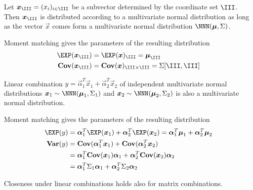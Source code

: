 \documentclass[landscape,footrule]{foils}
\renewcommand{\VAR}{\mathbf{Var}}
\newcommand{\COV}{\mathbf{Cov}}
\begin{document}


Let $\vec{x}_{\III}=(x_i)_{i\in\III}$ be a subvector determined by the coordinate set $\III$.
Then $\vec{x}_{\III}$ is distributed according to a multivariate normal distribution as long as 
the vector $\vec{x}$ comes form a multivariate normal distribution $\NNN(\vec{\mu},\Sigma)$.

\begin{triangles}
\item Moment matching gives the parameters of the resulting distribution 
\begin{align*}
\EXP(\vec{x}_{\III})&= \EXP(\vec{x})_{\III}=\vec{\mu}_{\III} \\
\COV(\vec{x}_{\III})&=\COV(\vec{x})_{\III\times \III}=\Sigma[\III, \III]
\end{align*}
\end{triangles}


Linear combination $y=\vec{\alpha}_1^T \vec{x}_1+\vec{\alpha}_2^T\vec{x}_2$ of independent multivariate normal distributions $\vec{x}_1\sim\NNN(\vec{\mu}_1,\Sigma_1)$ and $\vec{x}_2\sim\NNN(\vec{\mu}_2,\Sigma_2)$ is also  a multivariate normal distribution.

\begin{triangles}
\item Moment matching gives the parameters of the resulting distribution 
\begin{align*}
\EXP(y)&= \vec{\alpha}_1^T\EXP(\vec{x}_1)+\vec{\alpha}_2^T\EXP(\vec{x}_2)=
\vec{\alpha}_1^T\vec{\mu}_1+\vec{\alpha}_2^T\vec{\mu}_2\\
\VAR(y)&=\COV(\vec{\alpha}_1^T \vec{x}_1) + \COV(\vec{\alpha}_2^T \vec{x}_2)\\
&=\vec{\alpha}_1^T \COV(\vec{x}_1)\vec{\alpha}_1+ \vec{\alpha}_2^T \COV(\vec{x}_2)\vec{\alpha}_2\\
&=\vec{\alpha}_1^T \Sigma_1\vec{\alpha}_1+ \vec{\alpha}_2^T \Sigma_2\vec{\alpha}_2
\end{align*}
\item Closeness under linear combinations holds also for matrix combinations. 
\end{triangles}

\end{document}
